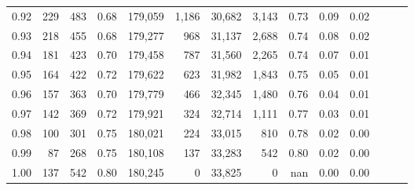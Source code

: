 \begin{tabular}{rrrrrrrrrrrrrr}
0.92 &    229 &  483 &  0.68 &  179,059 &    1,186 &  30,682 &   3,143 &  0.73 &  0.09 &      0.02 \\
0.93 &    218 &  455 &  0.68 &  179,277 &      968 &  31,137 &   2,688 &  0.74 &  0.08 &      0.02 \\
0.94 &    181 &  423 &  0.70 &  179,458 &      787 &  31,560 &   2,265 &  0.74 &  0.07 &      0.01 \\
0.95 &    164 &  422 &  0.72 &  179,622 &      623 &  31,982 &   1,843 &  0.75 &  0.05 &      0.01 \\
0.96 &    157 &  363 &  0.70 &  179,779 &      466 &  32,345 &   1,480 &  0.76 &  0.04 &      0.01 \\
0.97 &    142 &  369 &  0.72 &  179,921 &      324 &  32,714 &   1,111 &  0.77 &  0.03 &      0.01 \\
0.98 &    100 &  301 &  0.75 &  180,021 &      224 &  33,015 &     810 &  0.78 &  0.02 &      0.00 \\
0.99 &     87 &  268 &  0.75 &  180,108 &      137 &  33,283 &     542 &  0.80 &  0.02 &      0.00 \\
1.00 &    137 &  542 &  0.80 &  180,245 &        0 &  33,825 &       0 &   nan &  0.00 &      0.00 \\
\bottomrule
\end{tabular}
